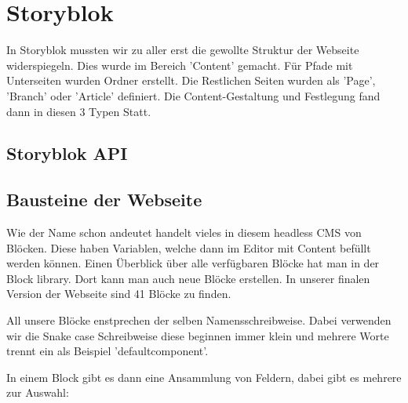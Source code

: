 

\section{Storyblok}

In Storyblok mussten wir zu aller erst die gewollte Struktur der Webseite widerspiegeln. Dies wurde im Bereich 'Content' gemacht. 
Für Pfade mit Unterseiten wurden Ordner erstellt. Die Restlichen Seiten wurden als 'Page', 'Branch' oder 'Article' definiert.
Die Content-Gestaltung und Festlegung fand dann in diesen 3 Typen Statt. 


\subsection{Storyblok API}

\subsection{Bausteine der Webseite}
Wie der Name schon andeutet handelt vieles in diesem headless CMS von Blöcken. Diese haben Variablen, welche dann im Editor mit Content befüllt werden können. 
Einen Überblick über alle verfügbaren Blöcke hat man in der Block library. Dort kann man auch neue Blöcke erstellen. In unserer finalen Version der Webseite sind 41 Blöcke zu finden. 

All unsere Blöcke enstprechen der selben Namensschreibweise. Dabei verwenden wir die Snake case Schreibweise diese beginnen immer klein und mehrere Worte trennt ein \textunderscore  als Beispiel 'default\textunderscore component'.

In einem Block gibt es dann eine Ansammlung von Feldern, dabei gibt es mehrere zur Auswahl:


